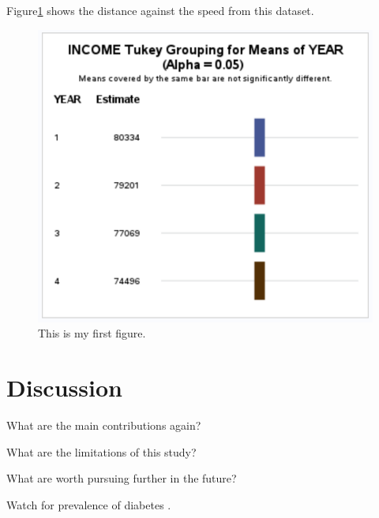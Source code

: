\documentclass[12pt]{article}
\begin{document}
Figure\ref{fig:cars} shows the distance against the speed from this dataset.
\begin{figure}[tbp]
  \centering
  \includegraphics[width=\textwidth]{Income by year.pdf}
  \caption{This is my first figure.}\label{fig:cars}
\end{figure}

\section{Discussion}\label{sec:disc}

What are the main contributions again?

What are the limitations of this study?

What are worth pursuing further in the future?

\lipsum[1]
Watch for prevalence of diabetes \citep{wild2004global}.
\citet{wild2004global}

\appendix



\end{document}
